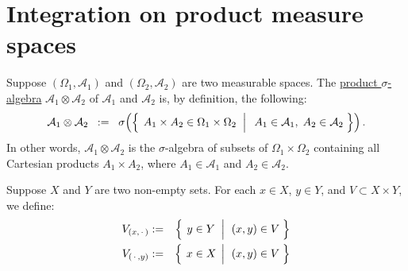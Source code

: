 

\section{Integration on product measure spaces}
\setcounter{theorem}{0}
\setcounter{equation}{0}

\renewcommand{\theenumi}{\roman{enumi}}
\renewcommand{\labelenumi}{\textnormal{(\theenumi)}$\;\;$}


\begin{definition}
\mbox{}
\vskip 0.1cm
\noindent
Suppose $\left(\Omega_{1},\mathcal{A}_{1}\right)$ and $\left(\Omega_{2},\mathcal{A}_{2}\right)$
are two measurable spaces.
The \underline{product $\sigma$-algebra} $\mathcal{A}_{1}\otimes\mathcal{A}_{2}$
of $\mathcal{A}_{1}$ and $\mathcal{A}_{2}$ is, by definition, the following:
\begin{equation*}
\mathcal{A}_{1}\otimes\mathcal{A}_{2}
\;\; := \;\;
\sigma\!\left(\left\{\;
\left.
A_{1} \times A_{2} \overset{{\color{white}.}}{\in} \Omega_{1} \times \Omega_{2}
\;\;\right\vert\;\;
A_{1} \in \mathcal{A}_{1},\;
A_{2} \in \mathcal{A}_{2}
\;\right\}\right).
\end{equation*}
In other words, $\mathcal{A}_{1} \otimes \mathcal{A}_{2}$ is the $\sigma$-algebra of subsets of $\Omega_{1} \times \Omega_{2}$
containing all Cartesian products $A_{1} \times A_{2}$, where $A_{1} \in \mathcal{A}_{1}$ and $A_{2} \in \mathcal{A}_{2}$.
\end{definition}

\begin{definition}
\mbox{}
\vskip 0.1cm
\noindent
Suppose $X$ and $Y$ are two non-empty sets.
For each $x \in X$, $y \in Y$, and $V \subset X \times Y$, we define:
\begin{eqnarray*}
V_{(x,\,\cdot\,)} &:=& \left\{\;\left. y \overset{{\color{white}.}}{\in} Y \;\;\right\vert\;\, (x,y) \in V \;\right\}
\\
V_{(\,\cdot\,,y)} &:=& \left\{\;\left. x \overset{{\color{white}.}}{\in} X \,\;\right\vert\;\, (x,y) \in V \;\right\}
\end{eqnarray*}
\end{definition}

